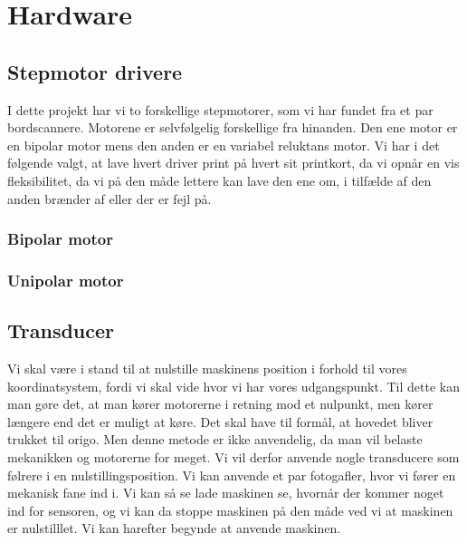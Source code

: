 \chapter{Hardware}


\section{Stepmotor drivere}
I dette projekt har vi to forskellige stepmotorer, som vi har fundet
fra et par bordscannere. Motorene er selvfølgelig forskellige fra
hinanden. Den ene motor er en bipolar motor mens den anden er en
variabel reluktans motor. Vi har i det følgende valgt, at lave hvert
driver print på hvert sit printkort, da vi opnår en vis fleksibilitet,
da vi på den måde lettere kan lave den ene om, i tilfælde af den anden
brænder af eller der er fejl på. 

\subsection{Bipolar motor}

\subsection{Unipolar motor}

\section{Transducer}
Vi skal være i stand til at nulstille maskinens position i forhold til
vores koordinatsystem, fordi vi skal vide hvor vi har vores
udgangspunkt. Til dette kan man gøre det, at man kører motorerne i
retning mod et nulpunkt, men kører længere end det er muligt at
køre. Det skal have til formål, at hovedet bliver trukket til
origo. Men denne metode er ikke anvendelig, da man vil belaste
mekanikken og motorerne for meget. Vi vil derfor anvende nogle
transducere som følrere i en nulstillingsposition. Vi kan anvende et
par fotogafler, hvor vi fører en mekanisk fane ind i. Vi kan så se
lade maskinen se, hvornår der kommer noget ind for sensoren, og vi kan
da stoppe maskinen på den måde ved vi at maskinen er nulstilllet. Vi
kan harefter begynde at anvende maskinen. 

